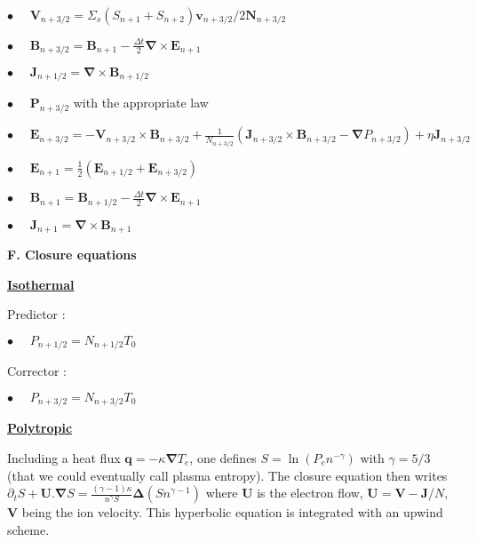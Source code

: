 \documentclass[a4paper,11pt]{letter}
\begin{document}
$\displaystyle \bullet \,\,\,\,\,\,\,\, \mathbf V_{n+3/2} = \Sigma_s (S_{n+1} + S_{n+2}) \mathbf v_{n+3/2} / 2 \mathbf N_{n+3/2} $

$\displaystyle \bullet \,\,\,\,\,\,\,\, \mathbf B_{n+3/2} = \mathbf B_{n+1} - \frac{\Delta t}{2} \boldsymbol{\nabla} \times \mathbf E_{n+1}$

$\displaystyle \bullet \,\,\,\,\,\,\,\, \mathbf J_{n+1/2} = \boldsymbol{\nabla} \times \mathbf B_{n+1/2}$

$\displaystyle \bullet \,\,\,\,\,\,\,\, \mathbf P_{n+3/2}$ with the appropriate law

$\displaystyle \bullet \,\,\,\,\,\,\,\, \mathbf E_{n+3/2} = - \mathbf V_{n+3/2} \times \mathbf B_{n+3/2} + \frac{1}{N_{n+3/2}} \left( \mathbf J_{n+3/2} \times \mathbf B_{n+3/2} - \boldsymbol{\nabla} P_{n+3/2} \right) + \eta \mathbf J_{n+3/2}$

$\displaystyle \bullet \,\,\,\,\,\,\,\, \mathbf E_{n+1} = \frac{1}{2}(\mathbf E_{n+1/2} + \mathbf E_{n+3/2})$

$\displaystyle \bullet \,\,\,\,\,\,\,\, \mathbf B_{n+1} = \mathbf B_{n+1/2} - \frac{\Delta t}{2} \boldsymbol{\nabla} \times \mathbf E_{n+1}$

$\displaystyle \bullet \,\,\,\,\,\,\,\, \mathbf J_{n+1} = \boldsymbol{\nabla} \times \mathbf B_{n+1}$

\newpage

{\bf F. Closure equations}

\bigskip

\underline{\bf Isothermal}

Predictor :

$\displaystyle \bullet \,\,\,\,\,\,\,\, P_{n+1/2} = N_{n+1/2} T_0$

Corrector :

$\displaystyle \bullet \,\,\,\,\,\,\,\, P_{n+3/2} = N_{n+3/2} T_0$

\bigskip

\underline{\bf Polytropic}

Including a heat flux $\mathbf q = - \kappa \boldsymbol{\nabla} T_e$, one defines $S = \ln (P_e n^{-\gamma})$ with $\gamma = 5/3$ (that we could eventually call plasma entropy). The closure equation then writes
$\displaystyle \partial_t S + \mathbf U . \boldsymbol{\nabla} S = \frac{(\gamma-1) \kappa}{n^{\gamma} S} \boldsymbol{\Delta} (S n^{\gamma-1})$ where $\mathbf U$ is the electron flow, $\mathbf U = \mathbf V - \mathbf J / N$, $\mathbf V$ being the ion velocity. This hyperbolic equation is integrated with an upwind scheme.
\end{document}
